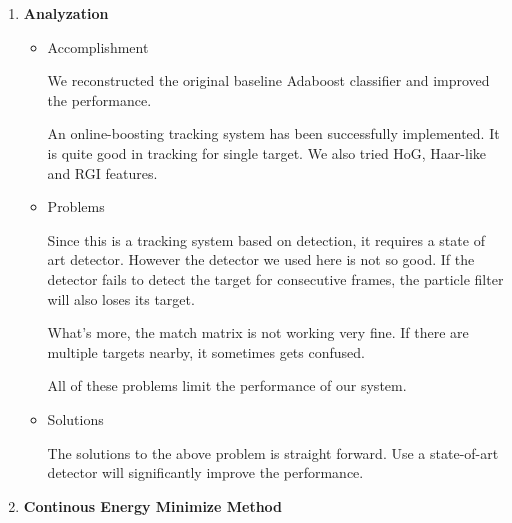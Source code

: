 \documentclass[a4paper]{article}
\begin{document}
\begin{enumerate}
\begin{itemize}
\end{itemize}

\item \textbf{Analyzation}

\begin{itemize}
\item Accomplishment

We reconstructed the original baseline Adaboost classifier and improved the performance.

An online-boosting tracking system has been successfully implemented. It is quite good in tracking for single target. We also tried HoG, Haar-like and RGI features.

\item Problems

Since this is a tracking system based on detection, it requires a state of art detector. However the detector we used here is not so good. If the detector fails to detect the target for consecutive frames, the particle filter will also loses its target.

What's more, the match matrix is not working very fine. If there are multiple targets nearby, it sometimes gets confused.

All of these problems limit the performance of our system.

\item Solutions

The solutions to the above problem is straight forward. Use a state-of-art detector will significantly improve the performance.

\end{itemize}

\item \textbf{Continous Energy Minimize Method}


\end{enumerate}

\clearpage


\end{document}
